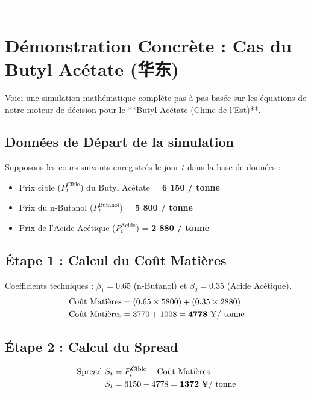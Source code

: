\documentclass[12pt,a4paper]{article}
\begin{document}
---

\newpage
\section{Démonstration Concrète : Cas du Butyl Acétate (华东)}
Voici une simulation mathématique complète pas à pas basée sur les équations de notre moteur de décision pour le **Butyl Acétate (Chine de l'Est)**.

\subsection{Données de Départ de la simulation}
Supposons les cours suivants enregistrés le jour $t$ dans la base de données :
\begin{itemize}
    \item Prix cible ($P^{\text{Cible}}_t$) du Butyl Acétate = \textbf{6 150 \yen / tonne}
    \item Prix du n-Butanol ($P^{\text{Butanol}}_t$) = \textbf{5 800 \yen / tonne}
    \item Prix de l'Acide Acétique ($P^{\text{Acide}}_t$) = \textbf{2 880 \yen / tonne}
\end{itemize}

\subsection{Étape 1 : Calcul du Coût Matières}
Coefficients techniques : $\beta_1 = 0.65$ (n-Butanol) et $\beta_2 = 0.35$ (Acide Acétique).
\begin{align}
\text{Coût Matières} &= (0.65 \times 5800) + (0.35 \times 2880) \\
\text{Coût Matières} &= 3770 + 1008 = \mathbf{4778\text{ \yen / tonne}}
\end{align}

\subsection{Étape 2 : Calcul du Spread}
\begin{align}
\text{Spread } S_t &= P^{\text{Cible}}_t - \text{Coût Matières} \\
S_t &= 6150 - 4778 = \mathbf{1372\text{ \yen / tonne}}
\end{align}
\end{document}
